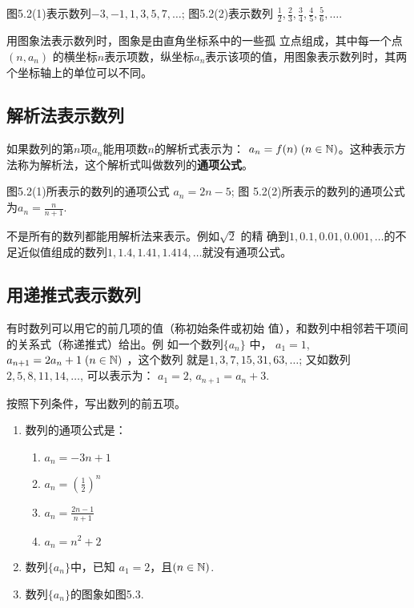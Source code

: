 图5.2(1)表示数列$-3,-1,1,3,5,7,\ldots$; 图5.2(2)表示数列
$\frac{1}{2},\frac{2}{3},\frac{3}{4},\frac{4}{5},\frac{5}{6},\ldots$.

用图象法表示数列时，图象是由直角坐标系中的一些孤
立点组成，其中每一个点$(n,a_n)$
的横坐标$n$表示项数，纵坐标$a_n$表示该项的值，用图象表示数列时，其两个坐标轴上的单位可以不同。

\subsection{解析法表示数列}
如果数列的第$n$项$a_n$能用项数$n$的解析式表示为：
$a_n=f(n)\; (n\in\mathbb{N})$。这种表示方法称为解析法，这个解析式叫做数列的\textbf{通项公式}。

图5.2(1)所表示的数列的通项公式
$a_n=2n-5$; 图
5.2(2)所表示的数列的通项公式为$a_n=\frac{n}{n+1}$.

不是所有的数列都能用解析法来表示。例如$\sqrt{2}$
的精
确到$1,0.1,0.01,0.001,\ldots$的不足近似值组成的数列$1,
1.4,1.41,1.414,\ldots$就没有通项公式。

\subsection{用递推式表示数列}
有时数列可以用它的前几项的值（称初始条件或初始
值），和数列中相邻若干项间的关系式（称递推式）给出。例
如一个数列$\{a_n\}$
中，
$a_1=1$,
$a_{n+1}=2a_{n}+1\; (n\in\mathbb{N})$
，这个数列
就是$1,3,7,15,31,63,\ldots$; 又如数列$2,5,8,11,14,
\ldots$, 可以表示为：
$a_1=2$, $a_{n+1}=a_n+3$.

\begin{ex}
    按照下列条件，写出数列的前五项。
\begin{enumerate}
    \item 数列的通项公式是：
\begin{multicols}{2}
\begin{enumerate}[(1)]
    \item $a_n=-3n+1$
    \item $a_n=\left(\frac{1}{2}\right)^n$
    \item $a_n=\frac{2n-1}{n+1}$
    \item $a_n=n^2+2$
\end{enumerate}    
\end{multicols}
\item 数列$\{a_n\}$中，已知
$a_1=2$，且$(n\in\mathbb{N})$.
\item 数列$\{a_n\}$的图象如图5.3.
\end{enumerate}
\end{ex}


